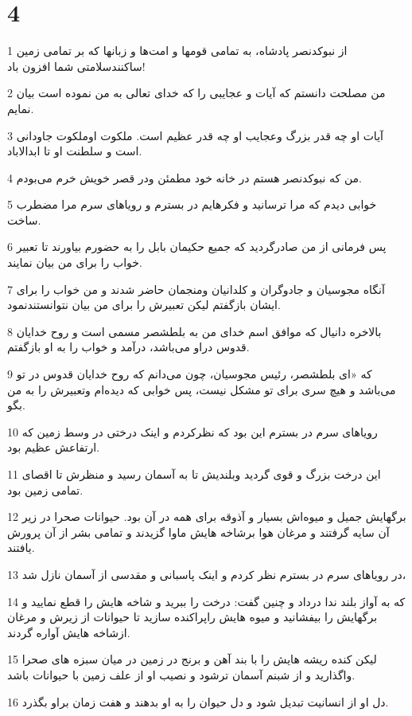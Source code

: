\chapter{4}

\par 1 از نبوکدنصر پادشاه، به تمامی قومها و امت‌ها و زبانها که بر تمامی زمین ساکنندسلامتی شما افزون باد!
\par 2 من مصلحت دانستم که آیات و عجایبی را که خدای تعالی به من نموده است بیان نمایم.
\par 3 آیات او چه قدر بزرگ وعجایب او چه قدر عظیم است. ملکوت اوملکوت جاودانی است و سلطنت او تا ابدالاباد.
\par 4 من که نبوکدنصر هستم در خانه خود مطمئن ودر قصر خویش خرم می‌بودم.
\par 5 خوابی دیدم که مرا ترسانید و فکرهایم در بسترم و رویاهای سرم مرا مضطرب ساخت.
\par 6 پس فرمانی از من صادرگردید که جمیع حکیمان بابل را به حضورم بیاورند تا تعبیر خواب را برای من بیان نمایند.
\par 7 آنگاه مجوسیان و جادوگران و کلدانیان ومنجمان حاضر شدند و من خواب را برای ایشان بازگفتم لیکن تعبیرش را برای من بیان نتوانستندنمود.
\par 8 بالاخره دانیال که موافق اسم خدای من به بلطشصر مسمی است و روح خدایان قدوس دراو می‌باشد، درآمد و خواب را به او باز‌گفتم.
\par 9 که «ای بلطشصر، رئیس مجوسیان، چون می‌دانم که روح خدایان قدوس در تو می‌باشد و هیچ سری برای تو مشکل نیست، پس خوابی که دیده‌ام وتعبیرش را به من بگو.
\par 10 رویاهای سرم در بسترم این بود که نظرکردم و اینک درختی در وسط زمین که ارتفاعش عظیم بود.
\par 11 این درخت بزرگ و قوی گردید وبلندیش تا به آسمان رسید و منظرش تا اقصای تمامی زمین بود.
\par 12 برگهایش جمیل و میوه‌اش بسیار و آذوقه برای همه در آن بود. حیوانات صحرا در زیر آن سایه گرفتند و مرغان هوا برشاخه هایش ماوا گزیدند و تمامی بشر از آن پرورش یافتند.
\par 13 در رویاهای سرم در بسترم نظر کردم و اینک پاسبانی و مقدسی از آسمان نازل شد،
\par 14 که به آواز بلند ندا درداد و چنین گفت: درخت را ببرید و شاخه هایش را قطع نمایید و برگهایش را بیفشانید و میوه هایش راپراکنده سازید تا حیوانات از زیرش و مرغان ازشاخه هایش آواره گردند.
\par 15 لیکن کنده ریشه هایش را با بند آهن و برنج در زمین در میان سبزه های صحرا واگذارید و از شبنم آسمان ترشود و نصیب او از علف زمین با حیوانات باشد.
\par 16 دل او از انسانیت تبدیل شود و دل حیوان را به او بدهند و هفت زمان براو بگذرد.
